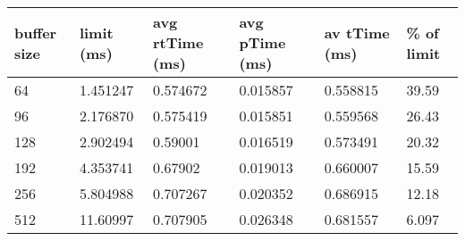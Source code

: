 \begin{table}[H]
\begin{center}
\begin{tabular}{ |p{1.6cm}||p{1.5cm}|p{1.5cm}|p{1.5cm}|p{1.5cm}|p{1.5cm}|  }
 \hline
 buffer size    & limit (ms)    & avg rtTime (ms)   & avg pTime (ms)    & av tTime (ms) & \% of limit\\
 \hline
 64             & 1.451247      & 0.574672          & 0.015857          & 0.558815      & 39.59 \\
 96             & 2.176870      & 0.575419          & 0.015851          & 0.559568      & 26.43 \\
 128            & 2.902494      & 0.59001           & 0.016519          & 0.573491      & 20.32 \\
 192            & 4.353741      & 0.67902           & 0.019013          & 0.660007      & 15.59 \\
 256            & 5.804988      & 0.707267          & 0.020352          & 0.686915      & 12.18 \\
 512            & 11.60997      & 0.707905          & 0.026348          & 0.681557      & 6.097 \\
 \hline
\end{tabular}
\end{center}
\end{table}